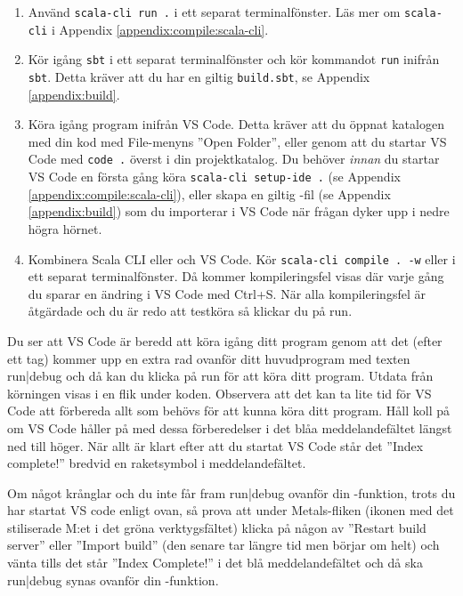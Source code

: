 \begin{enumerate}
  \item Använd \texttt{scala-cli run .} i ett separat terminalfönster. Läs mer om \texttt{scala-cli} i Appendix \ref{appendix:compile:scala-cli}.
  \item Kör igång \texttt{sbt} i ett separat terminalfönster och kör kommandot \texttt{run} inifrån \texttt{sbt}. Detta kräver att du har en giltig \texttt{build.sbt}, se Appendix \ref{appendix:build}.
  \item Köra igång program inifrån VS Code. Detta kräver att du öppnat katalogen med din kod med File-menyns ''Open Folder'', eller genom att du startar VS Code med \texttt{code .} överst i din projektkatalog. Du behöver \textit{innan} du startar VS Code en första gång köra \texttt{scala-cli setup-ide .} (se Appendix \ref{appendix:compile:scala-cli}), eller skapa en giltig -fil (se Appendix \ref{appendix:build}) som du importerar i VS Code när frågan dyker upp i nedre högra hörnet.
  \item Kombinera Scala CLI eller  och VS Code. Kör  \texttt{scala-cli compile . -w} eller  i ett separat terminalfönster. Då kommer kompileringsfel visas där varje gång du sparar en ändring i VS Code med Ctrl+S. När alla kompileringsfel är åtgärdade och du är redo att testköra så klickar du på \textsf{run}.
\end{enumerate}

Du ser att VS Code är beredd att köra igång ditt program genom att det (efter ett tag) kommer upp en extra rad ovanför ditt huvudprogram med texten \textsf{run|debug} och då kan du klicka på \textsf{run} för att köra ditt program. Utdata från körningen visas i en flik under koden. Observera att det kan ta lite tid för VS Code att förbereda allt som behövs för att kunna köra ditt program. Håll koll på om VS Code håller på med dessa förberedelser i det blåa meddelandefältet längst ned till höger. När allt är klart efter att du startat VS Code står det ''Index complete!'' bredvid en raketsymbol i meddelandefältet.

Om något krånglar och du inte får fram \textsf{run|debug} ovanför din -funktion, trots du har startat VS code enligt ovan, så prova att under Metals-fliken (ikonen med det stiliserade M:et i det gröna verktygsfältet) klicka på någon av ''Restart build server'' eller ''Import build'' (den senare tar längre tid men börjar om helt) och vänta tills det står ''Index Complete!'' i det blå meddelandefältet och då ska \textsf{run|debug} synas ovanför din -funktion.

